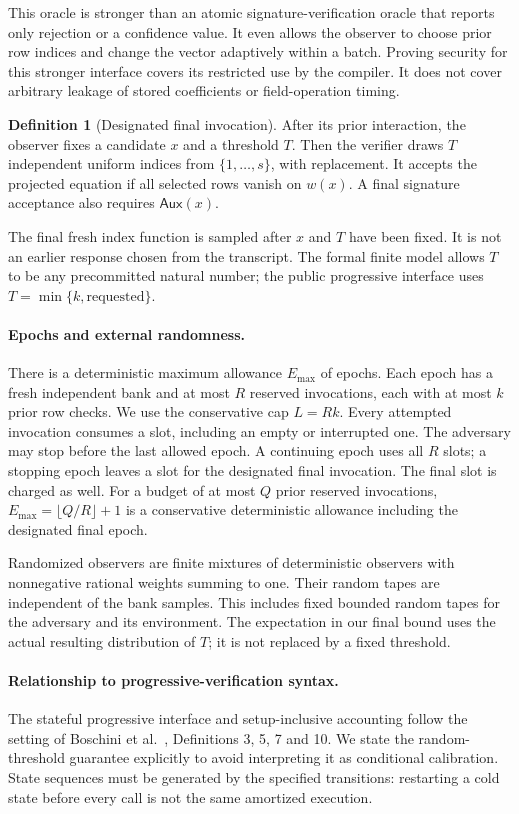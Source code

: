 \documentclass[11pt,letterpaper]{article}
\theoremstyle{definition}
\newtheorem{definition}[theorem]{Definition}
\newcommand{\Aux}{\mathsf{Aux}}
\newcommand{\Emax}{E_{\max}}
\begin{document}
This oracle is stronger than an atomic signature-verification oracle that reports only rejection or a confidence value. It even allows the observer to choose prior row indices and change the vector adaptively within a batch. Proving security for this stronger interface covers its restricted use by the compiler. It does not cover arbitrary leakage of stored coefficients or field-operation timing.

\begin{definition}[Designated final invocation]
After its prior interaction, the observer fixes a candidate $x$ and a threshold $T$. Then the verifier draws $T$ independent uniform indices from $\{1,\ldots,s\}$, with replacement. It accepts the projected equation if all selected rows vanish on $w(x)$. A final signature acceptance also requires $\Aux(x)$.
\end{definition}

The final fresh index function is sampled after $x$ and $T$ have been fixed. It is not an earlier response chosen from the transcript. The formal finite model allows $T$ to be any precommitted natural number; the public progressive interface uses $T=\min\{k,\text{requested}\}$.

\paragraph{Epochs and external randomness.}
There is a deterministic maximum allowance $\Emax$ of epochs. Each epoch has a fresh independent bank and at most $R$ reserved invocations, each with at most $k$ prior row checks. We use the conservative cap $L=Rk$. Every attempted invocation consumes a slot, including an empty or interrupted one. The adversary may stop before the last allowed epoch. A continuing epoch uses all $R$ slots; a stopping epoch leaves a slot for the designated final invocation. The final slot is charged as well. For a budget of at most $Q$ prior reserved invocations, $\Emax=\lfloor Q/R\rfloor+1$ is a conservative deterministic allowance including the designated final epoch.

Randomized observers are finite mixtures of deterministic observers with nonnegative rational weights summing to one. Their random tapes are independent of the bank samples. This includes fixed bounded random tapes for the adversary and its environment. The expectation in our final bound uses the actual resulting distribution of $T$; it is not replaced by a fixed threshold.

\paragraph{Relationship to progressive-verification syntax.}
The stateful progressive interface and setup-inclusive accounting follow the setting of Boschini et al.~\cite{bfp}, Definitions 3, 5, 7 and 10. We state the random-threshold guarantee explicitly to avoid interpreting it as conditional calibration. State sequences must be generated by the specified transitions: restarting a cold state before every call is not the same amortized execution.
\end{document}
